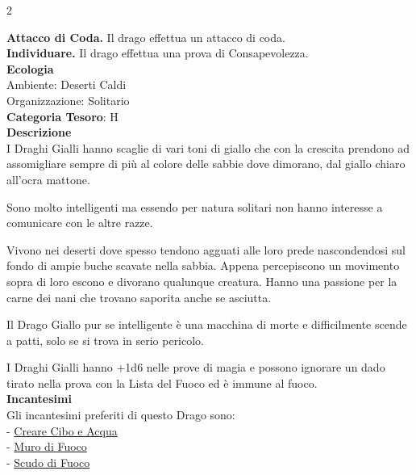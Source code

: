 \begin{multicols}{2}
{\textbf{Attacco di Coda.} Il drago effettua un attacco di coda.\\
\textbf{Individuare.} Il drago effettua una prova di Consapevolezza.\\
\textbf{Ecologia}\\
Ambiente: Deserti Caldi\\
Organizzazione: Solitario\\
\textbf{Categoria Tesoro}: H\\
\textbf{Descrizione}\\
I Draghi Gialli hanno scaglie di vari toni di giallo che con la crescita prendono ad assomigliare sempre di più al colore delle sabbie dove dimorano, dal giallo chiaro all'ocra mattone.

Sono molto intelligenti ma essendo per natura solitari non hanno interesse a comunicare con le altre razze.

Vivono nei deserti dove spesso tendono agguati alle loro prede nascondendosi sul fondo di ampie buche scavate nella sabbia.
Appena percepiscono un movimento sopra di loro escono e divorano qualunque creatura.
Hanno una passione per la carne dei nani che trovano saporita anche se asciutta.

Il Drago Giallo pur se intelligente è una macchina di morte e difficilmente scende a patti, solo se si trova in serio pericolo.

I Draghi Gialli hanno +1d6 nelle prove di magia e possono ignorare un dado tirato nella prova con la Lista del Fuoco ed è immune al fuoco.
\\
\textbf{Incantesimi}\\
Gli incantesimi preferiti di questo Drago sono:\\
- \hyperlink{Creare Cibo e Acqua}{Creare Cibo e Acqua}\\
- \hyperlink{Muro di Fuoco}{Muro di Fuoco}\\
- \hyperlink{Scudo di Fuoco}{Scudo di Fuoco}

}
\end{multicols}
